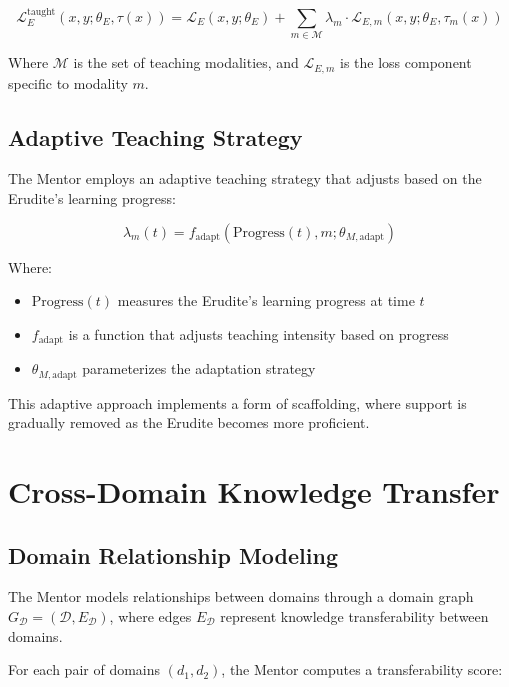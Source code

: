 \begin{equation}
\mathcal{L}_{E}^{\text{taught}}(x, y; \theta_E, \tau(x)) = \mathcal{L}_E(x, y; \theta_E) + \sum_{m \in \mathcal{M}} \lambda_m \cdot \mathcal{L}_{E,m}(x, y; \theta_E, \tau_m(x))
\end{equation}

Where $\mathcal{M}$ is the set of teaching modalities, and $\mathcal{L}_{E,m}$ is the loss component specific to modality $m$.

\subsection{Adaptive Teaching Strategy}

The Mentor employs an adaptive teaching strategy that adjusts based on the Erudite's learning progress:

\begin{equation}
\lambda_m(t) = f_{\text{adapt}}(\text{Progress}(t), m; \theta_{M,\text{adapt}})
\end{equation}

Where:
\begin{itemize}
\item $\text{Progress}(t)$ measures the Erudite's learning progress at time $t$
\item $f_{\text{adapt}}$ is a function that adjusts teaching intensity based on progress
\item $\theta_{M,\text{adapt}}$ parameterizes the adaptation strategy
\end{itemize}

This adaptive approach implements a form of scaffolding, where support is gradually removed as the Erudite becomes more proficient.

\section{Cross-Domain Knowledge Transfer}

\subsection{Domain Relationship Modeling}

The Mentor models relationships between domains through a domain graph $G_{\mathcal{D}} = (\mathcal{D}, E_{\mathcal{D}})$, where edges $E_{\mathcal{D}}$ represent knowledge transferability between domains.

For each pair of domains $(d_1, d_2)$, the Mentor computes a transferability score:

